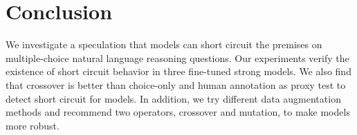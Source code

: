 \section{Conclusion}

We investigate a speculation that 
models can short circuit the premises on multiple-choice natural 
language reasoning questions. Our experiments verify the existence 
of short circuit behavior in three fine-tuned strong models.
We also find that crossover is better than choice-only and 
human annotation as proxy test to detect short circuit for models. 
In addition, we try different data augmentation methods and 
recommend two operators, crossover and mutation, 
to make models more robust.
